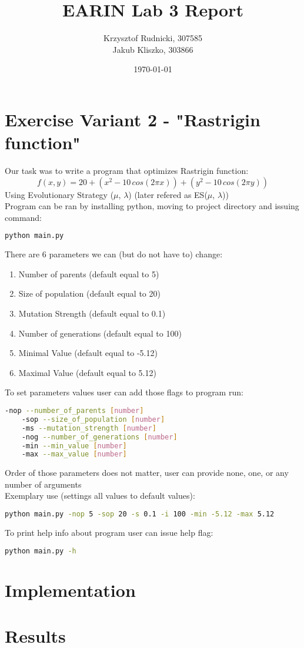 \documentclass{article}[12pt]
\title{EARIN Lab 3 Report}
\author{Krzysztof Rudnicki, 307585 \\ Jakub Kliszko, 303866  }
\date{\today}
\begin{document}
\maketitle

\section{Exercise Variant 2 - "Rastrigin function"}
Our task was to write a program that optimizes Rastrigin function: \\
\[ f (x, y) =
20 + (x^2 - 10 \, cos(2πx)) + (y^2 - 10 \,  cos(2πy)) \]
Using Evolutionary Strategy ($\mu$, $\lambda$) (later refered as ES($\mu$, $\lambda$)) \\ 
Program can be ran by installing python, moving to project directory and issuing command:
\begin{lstlisting}[language=bash]
python main.py
\end{lstlisting}
There are 6 parameters we can (but do not have to) change:
\begin{enumerate}
\item Number of parents (default equal to 5)
\item Size of population (default equal to 20)
\item Mutation Strength (default equal to 0.1)
\item Number of generations (default equal to 100)
\item Minimal Value (default equal to -5.12)
\item Maximal Value (default equal to 5.12)
\end{enumerate}
To set parameters values user can add those flags to program run:
\begin{lstlisting}[language=bash]
    -nop --number_of_parents [number]
    -sop --size_of_population [number]
    -ms --mutation_strength [number]
    -nog --number_of_generations [number]
    -min --min_value [number]
    -max --max_value [number]
\end{lstlisting}
Order of those parameters does not matter, user can provide none, one, or any number of arguments \\ 
Exemplary use (settings all values to default values):
\begin{lstlisting}[language=bash]
    python main.py -nop 5 -sop 20 -s 0.1 -i 100 -min -5.12 -max 5.12
\end{lstlisting}
To print help info about program user can issue help flag:
\begin{lstlisting}[language=bash]
    python main.py -h
\end{lstlisting}

\section{Implementation}
\section{Results}
\end{document}
